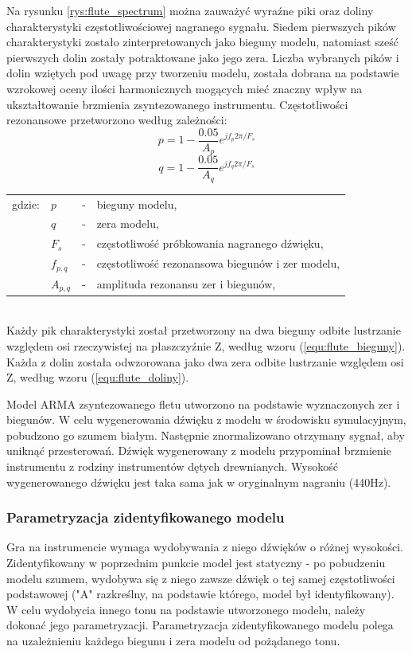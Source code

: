 Na rysunku \ref{rys:flute_spectrum} można zauważyć wyraźne piki oraz doliny charakterystyki częstotliwościowej nagranego sygnału. Siedem pierwszych pików charakterystyki zostało zinterpretowanych jako bieguny modelu, natomiast sześć pierwszych dolin zostały potraktowane jako jego zera. Liczba wybranych pików i dolin wziętych pod uwagę przy tworzeniu modelu, została dobrana na podstawie wzrokowej oceny ilości harmonicznych mogących mieć znaczny wpływ na ukształtowanie brzmienia zsyntezowanego instrumentu. Częstotliwości rezonansowe przetworzono według zależności:
\begin{equation} \label{equ:flute_bieguny}
p = 1-\frac{0.05}{A_{p}}e^{jf_{p}2\pi/F_{s}}
\end{equation}
\begin{equation} \label{equ:flute_doliny}
q = 1-\frac{0.05}{A_{q}}e^{jf_{q}2\pi/F_{s}}
\end{equation}
\begin{tabular}{ l l l l}
	gdzie: & $p$ &  - & bieguny modelu, \\
	&	$q$ & - &  zera modelu, \\
	&	$F_{s}$ & - &  częstotliwość próbkowania nagranego dźwięku,\\
	&	$f_{p,q}$ & - &  częstotliwość rezonansowa biegunów i zer modelu, \\
	&	$A_{p,q}$ & - &  amplituda rezonansu zer i biegunów, \\
\end{tabular} \\

Każdy pik charakterystyki został przetworzony na dwa bieguny odbite lustrzanie względem osi rzeczywistej na płaszczyźnie Z, według wzoru (\ref{equ:flute_bieguny}). Każda z dolin została odwzorowana jako dwa zera odbite lustrzanie względem osi Z, według wzoru (\ref{equ:flute_doliny}).

Model ARMA zsyntezowanego fletu utworzono na podstawie wyznaczonych zer i biegunów. W celu wygenerowania dźwięku z modelu w środowisku symulacyjnym, pobudzono go szumem białym. Następnie znormalizowano otrzymany sygnał, aby uniknąć przesterowań. Dźwięk wygenerowany z modelu przypominał brzmienie instrumentu z rodziny instrumentów dętych drewnianych. Wysokość wygenerowanego dźwięku jest taka sama jak w oryginalnym nagraniu (440Hz).

\subsubsection{Parametryzacja zidentyfikowanego modelu}
Gra na instrumencie wymaga wydobywania z niego dźwięków o różnej wysokości. Zidentyfikowany w poprzednim punkcie model jest statyczny - po pobudzeniu modelu szumem, wydobywa się z niego zawsze dźwięk o tej samej częstotliwości podstawowej ("A" razkreślny, na podstawie którego, model był identyfikowany). W celu wydobycia innego tonu na podstawie utworzonego modelu, należy dokonać jego parametryzacji. Parametryzacja zidentyfikowanego modelu polega na uzależnieniu każdego biegunu i zera modelu od pożądanego tonu.

